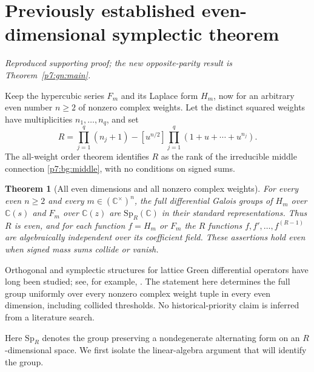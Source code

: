\documentclass[11pt,a4paper]{article}
\newtheorem{theorem}{Theorem}[section]
\theoremstyle{definition}
\theoremstyle{remark}
\numberwithin{equation}{section}
\begin{document}
\clearpage

\section{Previously established even-dimensional symplectic theorem}
\label{p7:fe:sec}
\noindent\textit{Reproduced supporting proof; the new opposite-parity result is Theorem~\ref{p7:gn:main}.}


Keep the hypercubic series $F_m$ and its Laplace form $H_m$,
now for an arbitrary even number $n\ge2$ of nonzero complex weights.
Let the distinct squared weights have multiplicities $n_1,\ldots,n_q$,
and set
\[
 R=\prod_{j=1}^q(n_j+1)
       -[u^{n/2}]\prod_{j=1}^q(1+u+\cdots+u^{n_j}).
\]
The all-weight order theorem identifies $R$ as the rank of the
irreducible middle connection \eqref{p7:bg:middle}, with no conditions on signed sums.

\begin{theorem}[All even dimensions and all nonzero complex weights]
\label{p7:fe:main}
For every even $n\ge2$ and every $m\in(\mathbb C^\times)^n$, the
full differential Galois groups of $H_m$ over $\mathbb C(s)$ and
$F_m$ over $\mathbb C(z)$ are $\mathrm{Sp}_R(\mathbb C)$ in their
standard representations. Thus $R$ is even, and for each function
$f=H_m$ or $F_m$ the $R$ functions $f,f',\ldots,f^{(R-1)}$ are
algebraically independent over its coefficient field. These assertions hold even when signed mass
sums collide or vanish.
\end{theorem}

Orthogonal and symplectic structures for lattice Green differential
operators have long been studied; see, for example,
\cite{p6:FS_BHMW2014}. The statement here determines the full group
uniformly over every nonzero complex weight tuple in every even
dimension, including collided thresholds. No historical-priority
claim is inferred from a literature search.

Here $\mathrm{Sp}_R$ denotes the group preserving a nondegenerate
alternating form on an $R$-dimensional space. We first isolate the
linear-algebra argument that will identify the group.
\end{document}

